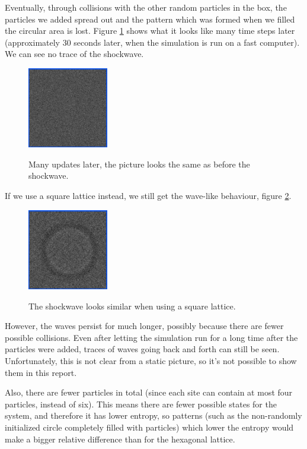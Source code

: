 \documentclass[12pt,a4paper]{article}
\begin{document}
Eventually, through collisions
with the other random particles in the box, the particles we added spread out and the pattern which was formed
when we filled the circular area is lost. Figure \ref{hexwaveend} shows what it looks like many time
steps later (approximately 30 seconds later, when the simulation is run on a fast computer).
We can see no trace of the shockwave.

\begin{figure}[htp]
\caption{Many updates later, the picture looks the same as before the shockwave.}
\centering
  \includegraphics[width=100pt]{figs/hexwaveend.png}
\label{hexwaveend}
\end{figure}



If we use a square lattice instead, we still get the wave-like behaviour, figure \ref{squarewave}.
\begin{figure}[htp]
\caption{The shockwave looks similar when using a square lattice.}
\centering
  \includegraphics[width=100pt]{figs/squarewave.png}
\label{squarewave}
\end{figure}

However, the waves persist for much longer, possibly because there are fewer possible collisions.
Even after letting the simulation run for a long time after the particles were added, traces of waves
going back and forth can still be seen. Unfortunately, this is not clear from a static picture, so
it's not possible to show them in this report.

Also, there are fewer particles in total (since each site can contain at most four particles, instead of six).
This means there are fewer possible states for the system, and therefore it has lower entropy, so patterns
(such as the non-randomly initialized circle completely filled with particles) which lower the entropy would make
a bigger relative difference than for the hexagonal lattice.
\end{document}
